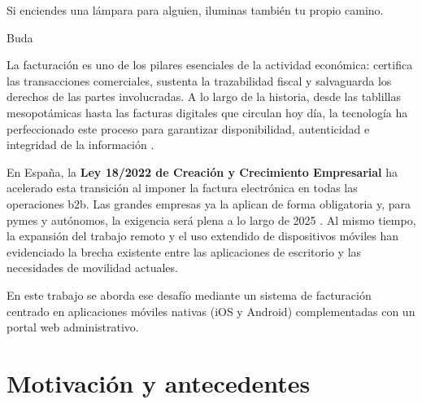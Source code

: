 \epigraph{Si enciendes una lámpara para alguien, iluminas también tu propio camino.}{Buda}

\begin{large}
  
La facturación es uno de los pilares esenciales de la actividad económica: certifica las transacciones comerciales, sustenta la trazabilidad fiscal y salvaguarda los derechos de las partes involucradas. A lo largo de la historia, desde las tablillas mesopotámicas hasta las facturas digitales que circulan hoy día, la tecnología ha perfeccionado este proceso para garantizar disponibilidad, autenticidad e integridad de la información \cite{origen_facturas}.

En España, la \textbf{Ley 18/2022 de Creación y Crecimiento Empresarial} ha acelerado esta transición al imponer la factura electrónica en todas las operaciones \gls{b2b}. Las grandes empresas ya la aplican de forma obligatoria y, para pymes y autónomos, la exigencia será plena a lo largo de 2025 \cite{ley18_2022}. Al mismo tiempo, la expansión del trabajo remoto y el uso extendido de dispositivos móviles han evidenciado la brecha existente entre las aplicaciones de escritorio y las necesidades de movilidad actuales.

En este trabajo se aborda ese desafío mediante un sistema de facturación centrado en aplicaciones móviles nativas (iOS y Android) complementadas con un portal web administrativo.

\end{large}

\section{Motivación y antecedentes}

